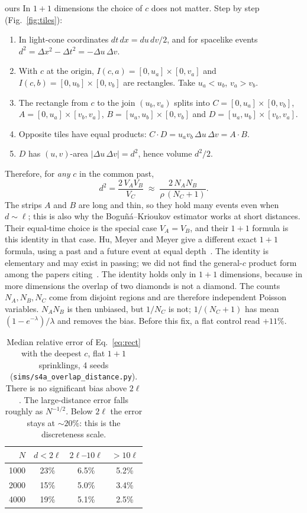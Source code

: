 \documentclass[11pt,a4paper]{article}
\newcommand{\tagbox}[2]{\textsf{\scriptsize\colorbox{#1!12}{\textcolor{#1!70!black}{#2}}}}
\newcommand{\ours}{\tagbox{orange}{ours}}
\begin{document}
\ours{} In $1+1$ dimensions the choice of $c$ does not matter. Step by step (Fig.~\ref{fig:tiles}):
\begin{enumerate}[leftmargin=*,itemsep=1pt]
\item In light-cone coordinates $dt\,dx=du\,dv/2$, and for spacelike events $d^2=\Delta x^2-\Delta t^2=-\Delta u\,\Delta v$.
\item With $c$ at the origin, $I(c,a)=[0,u_a]\times[0,v_a]$ and $I(c,b)=[0,u_b]\times[0,v_b]$ are rectangles. Take $u_a<u_b$, $v_a>v_b$.
\item The rectangle from $c$ to the join $(u_b,v_a)$ splits into $C=[0,u_a]\times[0,v_b]$, $A=[0,u_a]\times[v_b,v_a]$, $B=[u_a,u_b]\times[0,v_b]$ and $D=[u_a,u_b]\times[v_b,v_a]$.
\item Opposite tiles have equal products: $C\cdot D=u_av_b\,\Delta u\,\Delta v=A\cdot B$.
\item $D$ has $(u,v)$-area $|\Delta u\,\Delta v|=d^2$, hence volume $d^2/2$.
\end{enumerate}
Therefore, for \emph{any} $c$ in the common past,
\begin{equation}
d^2=\frac{2\,V_AV_B}{V_C}\;\approx\;\frac{2\,N_AN_B}{\rho\,(N_C+1)} .
\label{eq:rect}
\end{equation}
The strips $A$ and $B$ are long and thin, so they hold many events even when $d\sim\ell$; this is also why the Boguñá--Krioukov estimator works at short distances. Their equal-time choice is the special case $V_A=V_B$, and their $1+1$ formula is this identity in that case. Hu, Meyer and Meyer give a different exact $1+1$ formula, using a past and a future event at equal depth~\cite{HMM25}. The identity is elementary and may exist in passing; we did not find the general-$c$ product form among the papers citing~\cite{BK24}. The identity holds only in $1+1$ dimensions, because in more dimensions the overlap of two diamonds is not a diamond. The counts $N_A,N_B,N_C$ come from disjoint regions and are therefore independent Poisson variables. $N_AN_B$ is then unbiased, but $1/N_C$ is not; $1/(N_C+1)$ has mean $(1-e^{-\lambda})/\lambda$ and removes the bias. Before this fix, a flat control read $+11\%$.

\begin{table}[t]
\centering\small
\begin{tabular}{@{}rccc@{}}
\toprule
$N$ & $d<2\ell$ & $2\ell$--$10\ell$ & $>10\ell$\\
\midrule
1000 & 23\% & 6.5\% & 5.2\%\\
2000 & 15\% & 5.0\% & 3.4\%\\
4000 & 19\% & 5.1\% & 2.5\%\\
\bottomrule
\end{tabular}
\caption{Median relative error of Eq.~\eqref{eq:rect} with the deepest $c$, flat $1+1$ sprinklings, 4 seeds (\texttt{sims/s4a\_overlap\_distance.py}). There is no significant bias above $2\ell$. The large-distance error falls roughly as $N^{-1/2}$. Below $2\ell$ the error stays at $\sim20\%$: this is the discreteness scale.}
\label{tab:dist}
\end{table}
\end{document}
